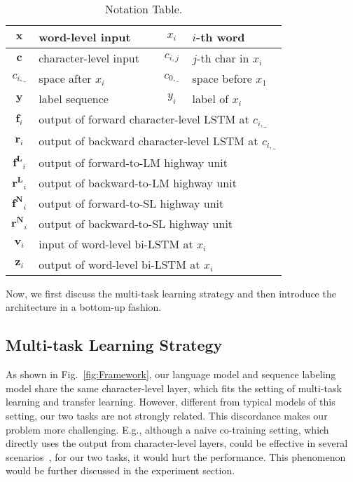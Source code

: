 \documentclass[letterpaper]{article} \usepackage{aaai18}  \usepackage{times}  \usepackage{helvet}  \usepackage{courier}  \usepackage{url}  \usepackage{graphicx}  \usepackage{multirow}
\def \myspace {\_}
\def \c {\mathbf{c}}
\def \f {\mathbf{f}}
\def \r {\mathbf{r}}
\def \v {\mathbf{v}}
\def \x {\mathbf{x}}
\def \y {\mathbf{y}}
\def \z {\mathbf{z}}
\def \fl {\mathbf{f^{L}}}
\def \fw {\mathbf{f^{N}}}
\def \rl {\mathbf{r^{L}}}
\def \rw {\mathbf{r^{N}}}
\begin{document}
\begin{table}[t]
\center
\begin{tabular}{c|l|c|l}
\hline
$\x$ & word-level input & $x_i$ & $i$-th word \\
\hline
$\c$ & character-level input & $c_{i,j}$ & $j$-th char in $x_i$ \\
\hline
$c_{i, \myspace}$ & space after $x_i$ & $c_{0, \myspace}$ & space before $x_1$\\
\hline
$\y$ & label sequence & $y_i$ & label of $x_i$ \\
\hline
$\f_i$ & \multicolumn{3}{l}{output of forward character-level LSTM at $c_{i, \myspace}$}\\
\hline
$\r_i$ & \multicolumn{3}{l}{output of backward character-level LSTM at $c_{i, \myspace}$}\\
\hline
$\fl_i$ & \multicolumn{3}{l}{output of forward-to-LM highway unit}\\
\hline
$\rl_i$ & \multicolumn{3}{l}{output of backward-to-LM highway unit}\\
\hline
$\fw_i$ & \multicolumn{3}{l}{output of forward-to-SL highway unit}\\
\hline
$\rw_i$ & \multicolumn{3}{l}{output of backward-to-SL highway unit}\\
\hline
$\v_i$ & \multicolumn{3}{l}{input of word-level bi-LSTM at $x_i$}\\
\hline
$\z_i$ & \multicolumn{3}{l}{output of word-level bi-LSTM at $x_i$}\\
\hline
\end{tabular}
\caption{Notation Table.}\label{tbl:notation}
\end{table}


Now, we first discuss the multi-task learning strategy and then introduce the architecture in a bottom-up fashion.

\subsection{Multi-task Learning Strategy}
As shown in Fig.~\ref{fig:Framework}, our language model and sequence labeling model share the same character-level layer, which fits the setting of multi-task learning and transfer learning.
However, different from typical models of this setting, our two tasks are not strongly related.
This discordance makes our problem more challenging.
E.g., although a naive co-training setting, which directly uses the output from character-level layers, could be effective in several scenarios~\cite{yang2017transfer},
for our two tasks, it would hurt the performance.
This phenomenon would be further discussed in the experiment section.
\end{document}
